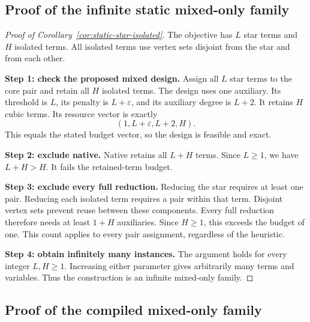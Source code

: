\documentclass[a4paper,onecolumn,11pt,unpublished]{quantumarticle}
\theoremstyle{remark}
\begin{document}
\subsection{Proof of the infinite static mixed-only family}
\label{app:static-star-proof-steps}

\begin{proof}[Proof of Corollary~\ref{cor:static-star-isolated}]
The objective has $L$ star terms and $H$ isolated terms.
All isolated terms use vertex sets disjoint from the star and from each other.

\textbf{Step 1: check the proposed mixed design.}
Assign all $L$ star terms to the core pair and retain all $H$ isolated terms.
The design uses one auxiliary. Its threshold is $L$, its penalty is
$L+\varepsilon$, and its auxiliary degree is $L+2$.
It retains $H$ cubic terms. Its resource vector is exactly
\[
(1,L+\varepsilon,L+2,H).
\]
This equals the stated budget vector, so the design is feasible and exact.

\textbf{Step 2: exclude native.}
Native retains all $L+H$ terms. Since $L\geq1$, we have $L+H>H$.
It fails the retained-term budget.

\textbf{Step 3: exclude every full reduction.}
Reducing the star requires at least one pair.
Reducing each isolated term requires a pair within that term.
Disjoint vertex sets prevent reuse between these components.
Every full reduction therefore needs at least $1+H$ auxiliaries.
Since $H\geq1$, this exceeds the budget of one.
This count applies to every pair assignment, regardless of the heuristic.

\textbf{Step 4: obtain infinitely many instances.}
The argument holds for every integer $L,H\geq1$.
Increasing either parameter gives arbitrarily many terms and variables.
Thus the construction is an infinite mixed-only family.
\end{proof}

\clearpage
\subsection{Proof of the compiled mixed-only family}
\label{app:compiled-star-proof-steps}
\end{document}
